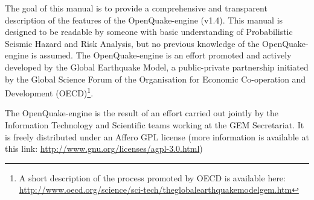 The goal of this manual is to provide a comprehensive and transparent description
of the features of the OpenQuake-engine (v1.4). This manual is designed to be 
readable by someone with basic understanding of Probabilistic Seismic Hazard 
and Risk Analysis, but no previous knowledge of the OpenQuake-engine is assumed.
%
The OpenQuake-engine is an effort promoted and actively developed by the
Global Earthquake Model, a public-private partnership initiated by the Global
Science Forum of the Organisation for Economic Co-operation and Development 
(OECD)\footnote{A short description of the process promoted by OECD is available 
here: \href{http://www.oecd.org/science/sci-tech/theglobalearthquakemodelgem.htm}
{http://www.oecd.org/science/sci-tech/theglobalearthquakemodelgem.htm}}.

The OpenQuake-engine is the result of an effort carried out jointly by the
Information Technology and Scientific teams working at the GEM Secretariat. 
It is freely distributed under an Affero GPL license 
(more information is available at this link: 
\href{http://www.gnu.org/licenses/agpl-3.0.html}
{http://www.gnu.org/licenses/agpl-3.0.html})

